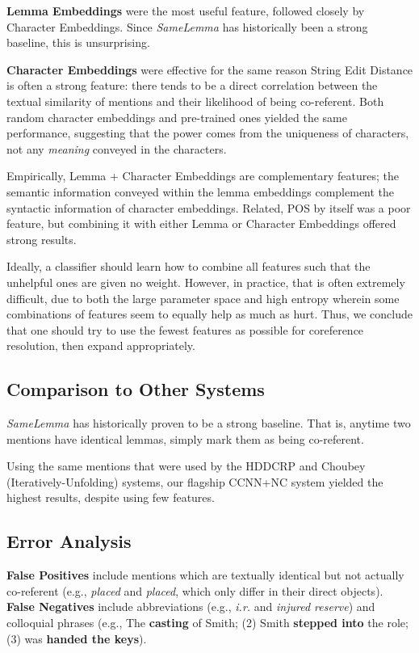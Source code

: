 \documentclass[11pt,a4paper]{article}
\begin{document}
\textbf{Lemma Embeddings} were the most useful feature, followed closely by Character Embeddings.  Since \textit{SameLemma} has historically been a strong baseline, this is unsurprising.  

\textbf{Character Embeddings} were effective for the same reason String Edit Distance is often a strong feature: there tends to be a direct correlation between the textual similarity of mentions and their likelihood of being co-referent. Both random character embeddings and pre-trained ones yielded the same performance, suggesting that the power comes from the uniqueness of characters, not any \textit{meaning} conveyed in the characters.

Empirically, Lemma + Character Embeddings are complementary features; the semantic information conveyed within the lemma embeddings complement the syntactic information of character embeddings.  Related, POS by itself was a poor feature, but combining it with either Lemma or Character Embeddings offered strong results. 

Ideally, a classifier should learn how to combine all features such that the unhelpful ones are given no weight.  However, in practice, that is often extremely difficult, due to both the large parameter space and high entropy wherein some combinations of features seem to equally help as much as hurt.  Thus, we conclude that one should try to use the fewest features as possible for coreference resolution, then expand appropriately.


\subsection{Comparison to Other Systems}
\textit{SameLemma} has historically proven to be a strong baseline.  That is, anytime two mentions have identical lemmas, simply mark them as being co-referent.

Using the same mentions that were used by the HDDCRP and Choubey (Iteratively-Unfolding) systems, our flagship CCNN+NC system yielded the highest results, despite using few features.


\subsection{Error Analysis}
\textbf{False Positives} include mentions which are textually identical but not actually co-referent (e.g., \textit{placed} and \textit{placed}, which only differ in their direct objects).  \textbf{False Negatives} include abbreviations (e.g., \textit{i.r.} and \textit{injured reserve}) and colloquial phrases (e.g., The \textbf{casting} of Smith; (2) Smith \textbf{stepped into} the role; (3) was \textbf{handed the keys}).
\end{document}

